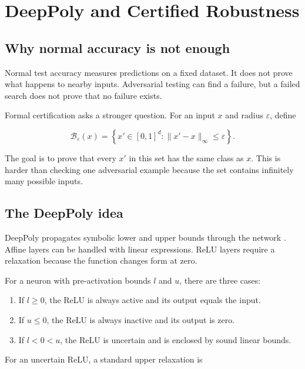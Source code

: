 \documentclass[11pt,a4paper]{report}
\begin{document}
\chapter{DeepPoly and Certified Robustness}

\section{Why normal accuracy is not enough}

Normal test accuracy measures predictions on a fixed dataset. It does not prove what happens to nearby inputs. Adversarial testing can find a failure, but a failed search does not prove that no failure exists.

Formal certification asks a stronger question. For an input \(x\) and radius \(\varepsilon\), define

\begin{equation}
\mathcal{B}_{\varepsilon}(x)
=
\left\{
x' \in [0,1]^d :
\lVert x' - x \rVert_{\infty} \leq \varepsilon
\right\}.
\end{equation}

The goal is to prove that every \(x'\) in this set has the same class as \(x\). This is harder than checking one adversarial example because the set contains infinitely many possible inputs.

\section{The DeepPoly idea}

DeepPoly propagates symbolic lower and upper bounds through the network \cite{singh2019deeppoly}. Affine layers can be handled with linear expressions. ReLU layers require a relaxation because the function changes form at zero.

For a neuron with pre-activation bounds \(l\) and \(u\), there are three cases:

\begin{enumerate}
  \item If \(l \geq 0\), the ReLU is always active and its output equals the input.
  \item If \(u \leq 0\), the ReLU is always inactive and its output is zero.
  \item If \(l < 0 < u\), the ReLU is uncertain and is enclosed by sound linear bounds.
\end{enumerate}

For an uncertain ReLU, a standard upper relaxation is
\end{document}

